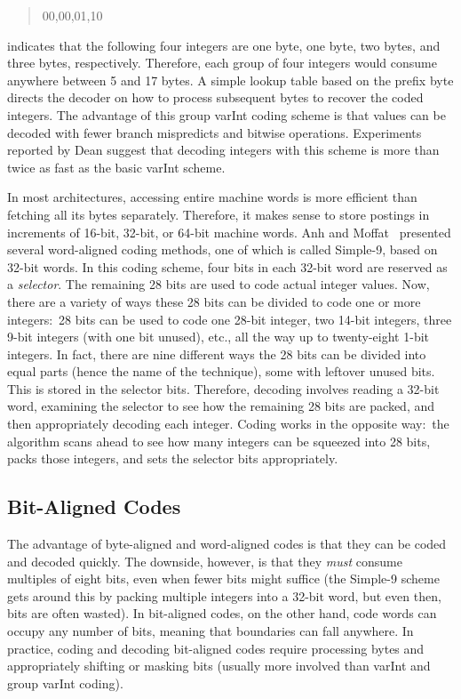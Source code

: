 \begin{quote}
00,00,01,10
\end{quote}

\noindent indicates that the following four integers are one byte, one
byte, two bytes, and three bytes, respectively.  Therefore, each group
of four integers would consume anywhere between 5 and 17 bytes.  A
simple lookup table based on the prefix byte directs the decoder on
how to process subsequent bytes to recover the coded integers.  The
advantage of this group varInt coding scheme is that values can be
decoded with fewer branch mispredicts and bitwise operations.
Experiments reported by Dean suggest that decoding integers with this
scheme is more than twice as fast as the basic varInt scheme.

In most architectures, accessing entire machine words is more
efficient than fetching all its bytes separately.  Therefore, it makes
sense to store postings in increments of 16-bit, 32-bit, or 64-bit
machine words.  Anh and Moffat~\cite{Anh_Moffat_2005} presented
several word-aligned coding methods, one of which is called Simple-9,
based on 32-bit words.  In this coding scheme, four bits in each
32-bit word are reserved as a \emph{selector}.  The remaining 28 bits
are used to code actual integer values.  Now, there are a variety of
ways these 28 bits can be divided to code one or more integers:\ 28
bits can be used to code one 28-bit integer, two 14-bit integers,
three 9-bit integers (with one bit unused), etc., all the way up to
twenty-eight 1-bit integers.  In fact, there are nine different ways
the 28 bits can be divided into equal parts (hence the name of the
technique), some with leftover unused bits.  This is stored in the
selector bits.  Therefore, decoding involves reading a 32-bit word,
examining the selector to see how the remaining 28 bits are packed,
and then appropriately decoding each integer.  Coding works in the
opposite way:\ the algorithm scans ahead to see how many integers can
be squeezed into 28 bits, packs those integers, and sets the selector
bits appropriately.

\subsection{Bit-Aligned Codes}

The advantage of byte-aligned and word-aligned codes is that they can
be coded and decoded quickly.  The downside, however, is that they
\emph{must} consume multiples of eight bits, even when fewer bits might
suffice (the Simple-9 scheme gets around this by packing multiple
integers into a 32-bit word, but even then, bits are often wasted).
In bit-aligned codes, on the other hand, code words can occupy any
number of bits, meaning that boundaries can fall anywhere.  In
practice, coding and decoding bit-aligned codes require processing
bytes and appropriately shifting or masking bits (usually more
involved than varInt and group varInt coding).

